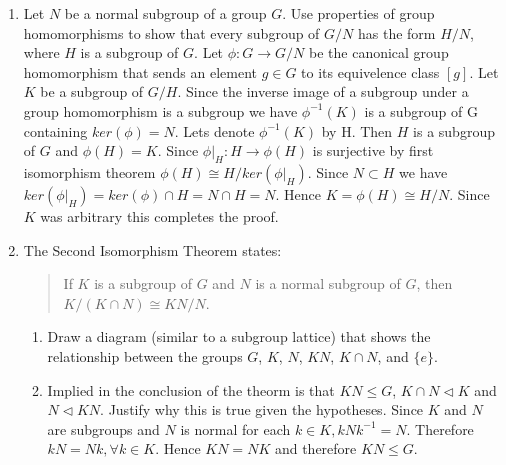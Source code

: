 \documentclass{article}
\newcommand{\iso}{\cong}
\newcommand{\normal}{\triangleleft}
\begin{document}


\begin{enumerate}

    \item Let $N$ be a normal subgroup of a group $G$. Use properties of group homomorphisms to show that every subgroup of $G/N$ has the form $H/N$, where $H$ is a subgroup of $G$. Let $\phi : G \rightarrow G/N$ be the canonical group homomorphism that sends an element $g \in G$ to its equivelence class $[g]$. Let $K$ be a subgroup of $G/H$. Since the inverse image of a subgroup under a group homomorphism is a subgroup we have $\phi^{-1}(K)$ is a subgroup of G containing $ker(\phi) = N$. Lets denote $\phi^{-1}(K)$ by H. Then $H$ is a subgroup of $G$ and $\phi(H)=K$. Since $\phi|_{H} : H \rightarrow \phi(H)$ is surjective by first isomorphism theorem $\phi(H) \cong H/ker(\phi|_{H})$. Since $N \subset H$ we have $ker(\phi|_{H})=ker(\phi) \cap H = N \cap H = N$. Hence $K=\phi(H) \cong H/N$. Since $K$ was arbitrary this completes the proof. 
    
    \item The Second Isomorphism Theorem states:
        \begin{quote}
            If $K$ is a subgroup of $G$ and $N$ is a normal subgroup of $G$, then $K/(K\cap N)\iso KN/N$.
        \end{quote}

        \begin{enumerate}
            \item Draw a diagram (similar to a subgroup lattice) that shows the relationship between the groups $G$, $K$, $N$, $KN$, $K\cap N$, and $\{e\}$. 

            \item Implied in the conclusion of the theorm is that $KN\le G$, $K\cap N\normal K$ and $N\normal KN$. Justify why this is true given the hypotheses. Since $K$ and $N$ are subgroups and $N$ is normal for each $k \in K, kNk^{-1} = N$. Therefore $kN = Nk, \forall k \in K$. Hence $KN = NK$ and therefore $KN \leq G$. 
    

\end{enumerate}
\end{enumerate}
\end{document}

